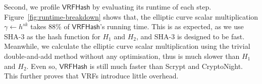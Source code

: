Second, we profile $\mathsf{VRFHash}$ by evaluating its runtime of each step.
Figure~\ref{fig:runtime-breakdown} shows that, the elliptic curve scalar multiplication $\gamma \gets h^{sk}$ takes 88\% of $\mathsf{VRFHash}$'s running time.
This is as expected, as we use SHA-3 as the hash function for $H_1$ and $H_2$, and SHA-3 is designed to be fast.
Meanwhile, we calculate the elliptic curve scalar multiplication using the trivial double-and-add method without any optimisation, thus is much slower than $H_1$ and $H_2$.
Even so, $\mathsf{VRFHash}$ is still much faster than Scrypt and CryptoNight.
This further proves that VRFs introduce little overhead.